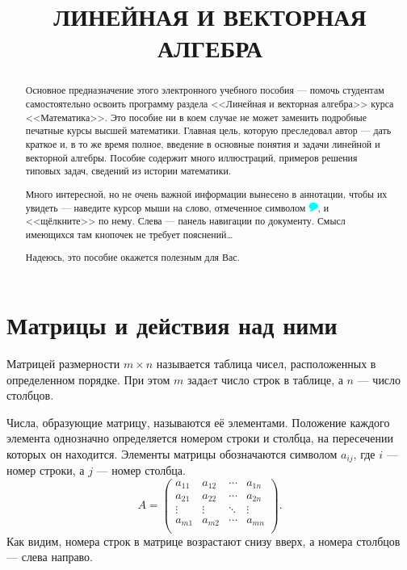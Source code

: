 \documentclass[10pt]{article}
\title{\bf ЛИНЕЙНАЯ И ВЕКТОРНАЯ АЛГЕБРА}
\author{\tooltip{Михеев~А.\,В.}{ya}}
\date{}
\newenvironment{defnt}%
{\begin{center}\fboxsep=1.6\fboxrule \shadowsize=4pt\begin{Sbox}
\begin{minipage}[c]{0.58\textwidth}}%
{\end{minipage}\end{Sbox}\shadowbox{\fboxsep=5pt\colorbox[rgb]{1,0.725,0.474}{\TheSbox}}
\end{center}}
\numberwithin{primer}{section}
\numberwithin{equation}{section}
\begin{document}
\maketitle

\thispagestyle{empty}
\begin{abstract}
%
%
Основное предназначение этого электронного учебного пособия --- помочь студентам самостоятельно освоить программу раздела <<Линейная и векторная алгебра>> курса <<Математика>>. Это пособие ни в коем случае не может заменить подробные печатные курсы высшей математики. Главная цель, которую преследовал автор --- дать краткое и, в то же время полное, введение в основные понятия и задачи линейной и векторной алгебры. Пособие содержит много иллюстраций, примеров решения типовых задач, сведений из истории математики. 

Много интересной, но не очень важной информации вынесено в аннотации, чтобы их увидеть --- наведите курсор мыши на слово, отмеченное символом \includegraphics[width=0.3cm]{fancytipmark.pdf}, и <<щёлкните>> по нему. Слева --- панель навигации по документу. Смысл имеющихся там кнопочек не требует пояснений\dots 

Надеюсь, это пособие окажется полезным для Вас.
\end{abstract}\newpage
\hypertarget{cont}{\tableofcontents}\newpage
\section{Матрицы и действия над ними}

\begin{defnt}
Матрицей размерности $m\times n$ называется таблица чисел,
расположенных в определенном порядке. При этом $m$ задаeт число
строк в таблице, а $n$ --- число столбцов.
\end{defnt}


Числа, образующие матрицу, называются её элементами. Положение
каждого элемента однозначно определяется номером строки и столбца,
на пересечении которых он находится. Элементы матрицы обозначаются
символом $a_{ij}$, где $i$ --- номер строки, а $j$ --- номер
столбца.
\begin{equation}\label{eq:matrix}
A = \begin{pmatrix}
  a_{11} & a_{12} & \cdots & a_{1n} \\
  a_{21} & a_{22} & \cdots & a_{2n} \\
  \vdots & \vdots & \ddots & \vdots \\
  a_{m1} & a_{m2} & \cdots & a_{mn} \\
\end{pmatrix}.
\end{equation}
Как видим, номера строк в матрице возрастают снизу вверх, а номера
столбцов --- слева направо.
\end{document}
